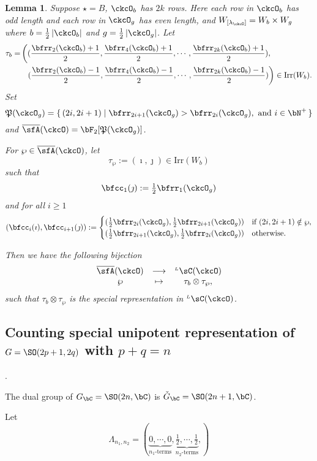 \documentclass[12pt,a4paper]{amsart}
\def\abs#1{\left|{#1}\right|}
\newcommand{\CQ}{{\mathcal {Q}}}
\numberwithin{equation}{section}
\newtheorem{lem}[thm]{Lemma}
\theoremstyle{remark}
\def\half{{\tfrac{1}{2}}}
\def\Irr{\mathrm{Irr}}
\def\ckGc{\check{G}_{\bC}}
\def\Gc{G_\bC}
\def\WLamck{W_{[\lambda_{\ckcO}]}}
\def\LC{{}^{\scriptscriptstyle L}\sC}
\def\CQ{\overline{\sfA}}%
\def\CPP{\mathfrak{P}}
\def\sP{\wp}
\begin{document}
\begin{lem}
  Suppose $\star = B$, $\ckcO_{b}$ has $2k$ rows. Here each row in $\ckcO_{b}$ has
  odd length and each row in $\ckcO_{g}$ has even length, and
  $\WLamck = W_{b}\times W_{g}$ where $b=\half \abs{\ckcO_{b}}$ and
  $g = \half\abs{\ckcO_{g}}$.
  Let
  \[
    \begin{split}
      \tau_{b} =  & \left( (\frac{\bfrr_{2}(\ckcO_{b})+1}{2}, \frac{\bfrr_{4}(\ckcO_{b})+1}{2}, \cdots, \frac{\bfrr_{2k}(\ckcO_{b})+1}{2}),\right.\\
        &\ \ \left. (\frac{\bfrr_{2}(\ckcO_{b})-1}{2}, \frac{\bfrr_{4}(\ckcO_{b})-1}{2}, \cdots, \frac{\bfrr_{2k}(\ckcO_{b})-1}{2})\right) \in \Irr(W_{b}).
    \end{split}
  \]
  Set
  \[
    \CPP(\ckcO_{g}) = \set{(2i,2i+1)| \bfrr_{2i+1}(\ckcO_{g})> \bfrr_{2i}(\ckcO_{g}), \text{
        and } i\in \bN^{+}}
  \]
  and $\CQ(\ckcO)= \bF_{2}[\CPP(\ckcO_{g})]$.

  For $\sP \in \CQ(\ckcO)$, let
  \[
    \tau_{\sP} := (\imath,\jmath) \in \Irr(W_{b})
  \]
  such that
  \[
    \bfcc_{1}(\jmath)  := \half\bfrr_{1}(\ckcO_{g})
  \]
  and for all $i\geq 1$
  \[
  (\bfcc_{i}(\imath), \bfcc_{i+1}(\jmath)):=
  \begin{cases}
    (\half \bfrr_{2i}(\ckcO_{g}), \half \bfrr_{2i+1}(\ckcO_{g}))
    & \text{if } (2i,2i+1)\notin \sP,\\
    (\half \bfrr_{2i+1}(\ckcO_{g}),\half \bfrr_{2i}(\ckcO_{g})) & \text{otherwise.}
  \end{cases}
  \]

  Then we have the following bijection
  \[
    \begin{array}{ccc}
      \CQ(\ckcO) &\longrightarrow & \LC(\ckcO)\\
      \sP & \mapsto & \tau_{b}\otimes \tau_{\sP},
    \end{array}
  \]
  such that $\tau_{b}\otimes \tau_{\sP}$ is the special representation in
  $\LC(\ckcO)$.
\end{lem}


\subsection{Counting special unipotent representation of $G=\SO(2p+1,2q)$ with
$p+q=n$}.

The dual group of $\Gc = \SO(2n,\bC)$ is $\ckGc = \SO(2n+1,\bC)$.

Let \[
  \Lambda_{n_{1}, n_{2}} = (\underbrace{0,\cdots,0}_{n_{1}\text{-terms}}, \underbrace{\half,\cdots,\half}_{n_{2}\text{-terms}}, )
\]
\end{document}
